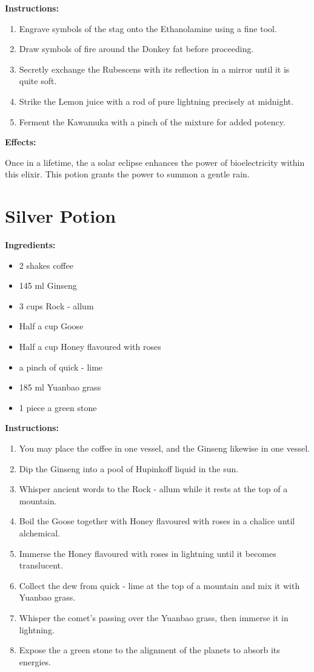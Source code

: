 \documentclass{article}
\begin{document}
\textbf{Instructions:}

\begin{enumerate}
  \item Engrave symbols of the stag onto the Ethanolamine using a fine tool.
  \item Draw symbols of fire around the Donkey fat before proceeding.
  \item Secretly exchange the Rubescens with its reflection in a mirror until it is quite soft.
  \item Strike the Lemon juice with a rod of pure lightning precisely at midnight.
  \item Ferment the Kawamuka with a pinch of the mixture for added potency.
\end{enumerate}

\textbf{Effects:}

Once in a lifetime, the a solar eclipse enhances the power of bioelectricity within this elixir. This potion grants the power to summon a gentle rain.

\newpage
\section*{Silver Potion}

\textbf{Ingredients:}

\begin{itemize}
  \item 2 shakes coffee
  \item 145 ml Ginseng
  \item 3 cups Rock - allum
  \item Half a cup Goose
  \item Half a cup Honey flavoured with roses
  \item a pinch of quick - lime
  \item 185 ml Yuanbao grass
  \item 1 piece a green stone
\end{itemize}

\textbf{Instructions:}

\begin{enumerate}
  \item You may place the coffee in one vessel, and the Ginseng likewise in one vessel.
  \item Dip the Ginseng into a pool of Hupinkoff liquid in the sun.
  \item Whisper ancient words to the Rock - allum while it rests at the top of a mountain.
  \item Boil the Goose together with Honey flavoured with roses in a chalice until alchemical.
  \item Immerse the Honey flavoured with roses in lightning until it becomes translucent.
  \item Collect the dew from quick - lime at the top of a mountain and mix it with Yuanbao grass.
  \item Whisper the comet’s passing over the Yuanbao grass, then immerse it in lightning.
  \item Expose the a green stone to the alignment of the planets to absorb its energies.
\end{enumerate}
\end{document}
